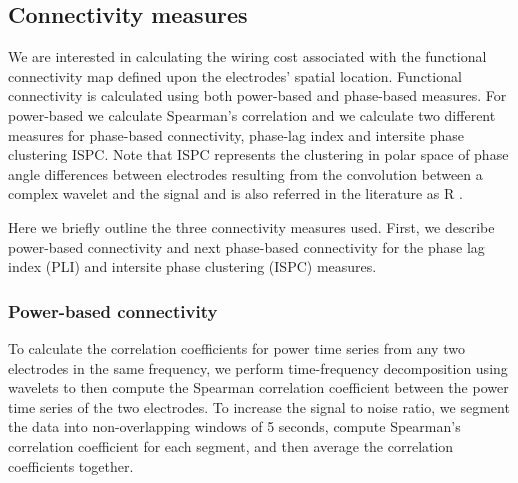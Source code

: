 \documentclass[11pt, onecolumn]{article}
\begin{document}
\subsection{Connectivity measures}
We are interested in calculating the wiring cost associated with the functional connectivity map defined upon the electrodes' spatial location. Functional connectivity is calculated using both power-based and phase-based measures. For power-based we calculate Spearman's correlation and we calculate two different measures for phase-based connectivity, phase-lag index \citep{stam2007phase} and intersite phase clustering ISPC. Note that ISPC represents the clustering in polar space of phase angle differences between electrodes resulting from the convolution between a complex wavelet and the signal and is also referred in the literature as R \citep{cohen2014analyzing}. 

Here we briefly outline the three connectivity measures used. First, we describe power-based connectivity and next phase-based connectivity for the phase lag index (PLI) and intersite phase clustering (ISPC) measures. 

\subsubsection{Power-based connectivity}
To calculate the correlation coefficients for power time series from any two electrodes in the same frequency, we perform time-frequency decomposition using wavelets to then compute the Spearman correlation coefficient between the power time series of the two electrodes. 
To increase the signal to noise ratio, we segment the data into non-overlapping windows of 5 seconds, compute Spearman's correlation coefficient for each segment, and then average the correlation coefficients together. 
\end{document}
